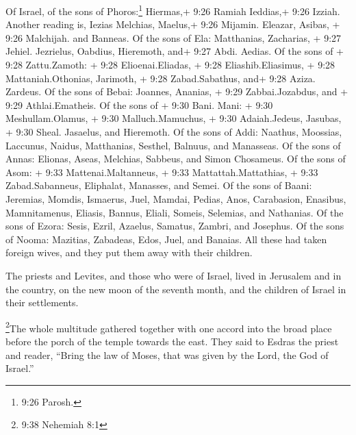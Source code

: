  Of Israel, of the sons of Phoros:\footnote{9:26 Parosh.}
Hiermas,+ 9:26 Ramiah Ieddias,+ 9:26 Izziah. Another reading is, Iezias
Melchias, Maelus,+ 9:26 Mijamin. Eleazar, Asibas, + 9:26 Malchijah. and
Banneas.  Of the sons of Ela: Matthanias, Zacharias, + 9:27
Jehiel. Jezrielus, Oabdius, Hieremoth, and+ 9:27 Abdi. Aedias.
 Of the sons of + 9:28 Zattu.Zamoth: + 9:28
Elioenai.Eliadas, + 9:28 Eliashib.Eliasimus, + 9:28 Mattaniah.Othonias,
Jarimoth, + 9:28 Zabad.Sabathus, and+ 9:28 Aziza. Zardeus. 
Of the sons of Bebai: Joannes, Ananias, + 9:29 Zabbai.Jozabdus, and +
9:29 Athlai.Ematheis.  Of the sons of + 9:30 Bani. Mani: +
9:30 Meshullam.Olamus, + 9:30 Malluch.Mamuchus, + 9:30 Adaiah.Jedeus,
Jasubas, + 9:30 Sheal. Jasaelus, and Hieremoth.  Of the
sons of Addi: Naathus, Moossias, Laccunus, Naidus, Matthanias, Sesthel,
Balnuus, and Manasseas.  Of the sons of Annas: Elionas,
Aseas, Melchias, Sabbeus, and Simon Chosameus.  Of the sons
of Asom: + 9:33 Mattenai.Maltanneus, + 9:33 Mattattah.Mattathias, + 9:33
Zabad.Sabanneus, Eliphalat, Manasses, and Semei.  Of the
sons of Baani: Jeremias, Momdis, Ismaerus, Juel, Mamdai, Pedias, Anos,
Carabasion, Enasibus, Mamnitamenus, Eliasis, Bannus, Eliali, Someis,
Selemias, and Nathanias. Of the sons of Ezora: Sesis, Ezril, Azaelus,
Samatus, Zambri, and Josephus.  Of the sons of Nooma:
Mazitias, Zabadeas, Edos, Juel, and Banaias.  All these had
taken foreign wives, and they put them away with their children.

 The priests and Levites, and those who were of Israel,
lived in Jerusalem and in the country, on the new moon of the seventh
month, and the children of Israel in their settlements.

 \footnote{9:38 Nehemiah 8:1}The whole multitude gathered
together with one accord into the broad place before the porch of the
temple towards the east.  They said to Esdras the priest
and reader, ``Bring the law of Moses, that was given by the Lord, the
God of Israel.''

